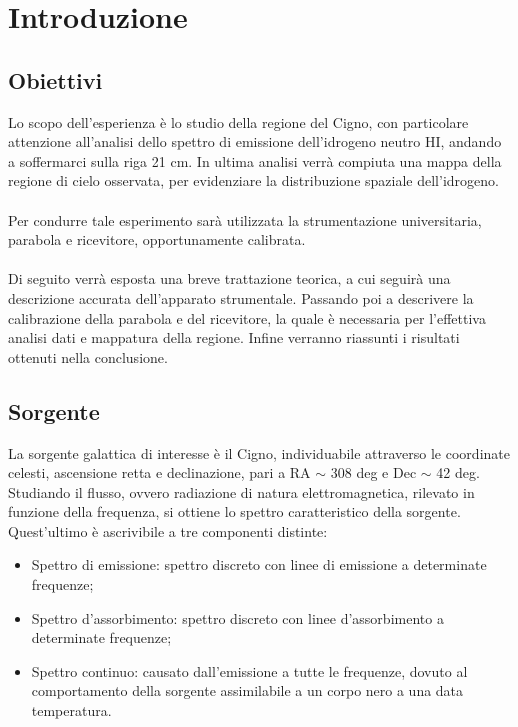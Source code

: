 \section{Introduzione}

\subsection{Obiettivi}
Lo scopo dell'esperienza è lo studio della regione del Cigno, con particolare attenzione all'analisi dello spettro di emissione dell'idrogeno neutro HI, andando a soffermarci sulla riga 21 cm. 
In ultima analisi verrà compiuta una mappa della regione di cielo osservata, per evidenziare la distribuzione spaziale dell'idrogeno.
\\\\
Per condurre tale esperimento sarà utilizzata la strumentazione universitaria, parabola e ricevitore, opportunamente calibrata.
\\\\
Di seguito verrà esposta una breve trattazione teorica, a cui seguirà una descrizione accurata dell'apparato strumentale. Passando poi a descrivere la calibrazione della parabola e del ricevitore, la quale è necessaria per l'effettiva analisi dati e mappatura della regione. Infine verranno riassunti i risultati ottenuti nella conclusione.



\subsection{Sorgente}
La sorgente galattica di interesse è il Cigno, individuabile attraverso le coordinate celesti, ascensione retta e declinazione, pari a RA $\sim$ 308 deg e Dec $\sim$ 42 deg.
Studiando il flusso, ovvero radiazione di natura elettromagnetica, rilevato in funzione della frequenza, si ottiene lo spettro caratteristico della sorgente. Quest'ultimo è ascrivibile a tre componenti distinte: 
\begin{itemize}
\item Spettro di emissione: spettro discreto con linee di emissione a determinate frequenze;
\item Spettro d'assorbimento: spettro discreto con linee d'assorbimento a determinate frequenze;
\item Spettro continuo: causato dall'emissione a tutte le frequenze, dovuto al comportamento della sorgente assimilabile a un corpo nero a una data temperatura. 
\end{itemize}

